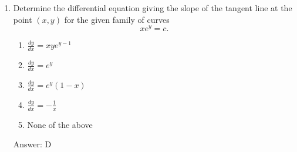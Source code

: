 \begin{enumerate}
\item  Determine the differential equation giving the slope of the tangent line at the point $(x,y)$ for the given family of curves
$$xe^y=c.$$

\begin{enumerate}
	\item $\frac{dy}{dx}=xye^{y-1}$ \\
	\item $\frac{dy}{dx}=e^y$ \\
	\item $\frac{dy}{dx}=e^y(1-x)$ \\
	\item $\frac{dy}{dx}=-\frac{1}{x}$ \\
	\item None of the above
\end{enumerate}
Answer: D
\vspace{2.3 in}
\end{enumerate}

